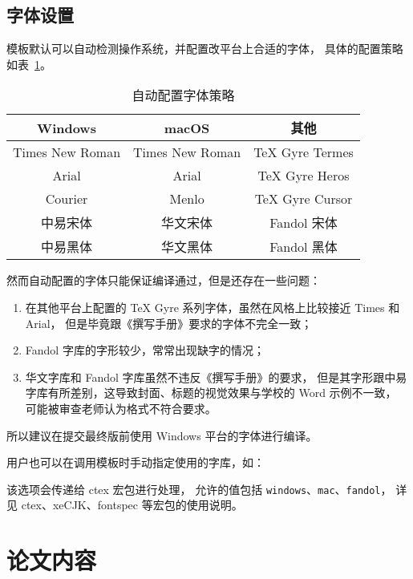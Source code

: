 \documentclass[a4paper]{ltxdoc}
\DeclareRobustCommand\pkg{\textsf}
\DeclareRobustCommand\opt{\texttt}
\begin{document}
\subsection{字体设置}
模板默认可以自动检测操作系统，并配置改平台上合适的字体，
具体的配置策略如表~\ref{tab:font}。
\begin{table}[htb]
  \centering
  \caption{自动配置字体策略}
  \label{tab:font}
  \begin{tabular}{ccc}
    \toprule
    Windows         & macOS           & 其他            \\
    \midrule
    Times New Roman & Times New Roman & TeX Gyre Termes \\
    Arial           & Arial           & TeX Gyre Heros  \\
    Courier         & Menlo           & TeX Gyre Cursor \\
    中易宋体        & 华文宋体        & Fandol 宋体     \\
    中易黑体        & 华文黑体        & Fandol 黑体     \\
    \bottomrule
  \end{tabular}
\end{table}

然而自动配置的字体只能保证编译通过，但是还存在一些问题：
\begin{enumerate}
  \item 在其他平台上配置的 TeX Gyre 系列字体，虽然在风格上比较接近 Times 和 Arial，
    但是毕竟跟《撰写手册》要求的字体不完全一致；
  \item Fandol 字库的字形较少，常常出现缺字的情况；
  \item 华文字库和 Fandol 字库虽然不违反《撰写手册》的要求，
    但是其字形跟中易字库有所差别，这导致封面、标题的视觉效果与学校的 Word 示例不一致，
    可能被审查老师认为格式不符合要求。
\end{enumerate}

所以建议在提交最终版前使用 Windows 平台的字体进行编译。

用户也可以在调用模板时手动指定使用的字库，如：
该选项会传递给 \pkg{ctex} 宏包进行处理，
允许的值包括 \opt{windows}、\opt{mac}、\opt{fandol}，
详见 \pkg{ctex}、\pkg{xeCJK}、\pkg{fontspec} 等宏包的使用说明。



\section{论文内容}
\end{document}

